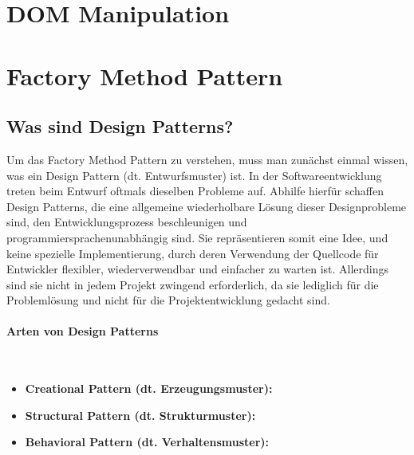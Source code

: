 

\section{DOM Manipulation}

\section{Factory Method Pattern}
\subsection{Was sind Design Patterns?}
Um das Factory Method Pattern zu verstehen, muss man zunächst einmal wissen, was ein Design Pattern (dt. Entwurfsmuster) ist. In der Softwareentwicklung treten beim Entwurf oftmals dieselben Probleme auf. Abhilfe hierfür schaffen Design Patterns, die eine allgemeine wiederholbare Lösung dieser Designprobleme sind, den Entwicklungsprozess beschleunigen und programmiersprachenunabhängig sind. Sie repräsentieren somit eine Idee, und keine spezielle Implementierung, durch deren Verwendung der Quellcode für Entwickler flexibler, wiederverwendbar und einfacher zu warten ist. Allerdings sind sie nicht in jedem Projekt zwingend erforderlich, da sie lediglich für die Problemlösung und nicht für die Projektentwicklung gedacht sind.

\paragraph{Arten von Design Patterns}\mbox{}\\

\begin{itemize}
	\item \textbf{Creational Pattern (dt. Erzeugungsmuster):}
	\item \textbf{Structural Pattern (dt. Strukturmuster):}
	\item \textbf{Behavioral Pattern (dt. Verhaltensmuster):}
\end{itemize}

